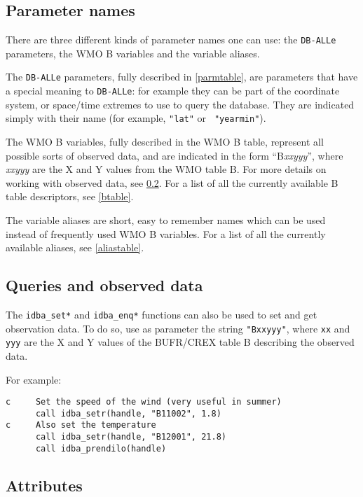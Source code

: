 \documentclass[final,12pt,a4paper,twoside]{book}
\newcommand{\dballe}{{\tt DB-ALLe}}
\begin{document}
\subsection {Parameter names}

There are three different kinds of parameter names one can use: the \dballe{}
parameters, the WMO B variables and the variable aliases.

The \dballe{} parameters, fully described in \ref{parmtable}, are parameters
that have a special meaning to \dballe{}: for example they can be part of the
coordinate system, or space/time extremes to use to query the database.  They
are indicated simply with their name (for example, {\tt "lat"} or {\tt
"yearmin"}).

The WMO B variables, fully described in the WMO B table, represent all possible
sorts of observed data, and are indicated in the form ``B{\itshape xxyyy}'',
where {\itshape xxyyy} are the X and Y values from the WMO table B.  For more
details on working with observed data, see \ref{obsdata}.  For a list of all
the currently available B table descriptors, see \ref{btable}.

The variable aliases are short, easy to remember names which can be used
instead of frequently used WMO B variables.  For a list of all the currently
available aliases, see \ref{aliastable}.

\subsection{Queries and observed data}
\label{obsdata}

The {\tt idba\_set*} and {\tt idba\_enq*} functions can also be used to set and get
observation data.  To do so, use as parameter the string {\tt "Bxxyyy"}, where
{\tt xx} and {\tt yyy} are the X and Y values of the BUFR/CREX table B describing
the observed data.

For example:

\begin{verbatim}
c     Set the speed of the wind (very useful in summer)
      call idba_setr(handle, "B11002", 1.8)
c     Also set the temperature
      call idba_setr(handle, "B12001", 21.8)
      call idba_prendilo(handle)
\end{verbatim}


\subsection{Attributes}
\end{document}
